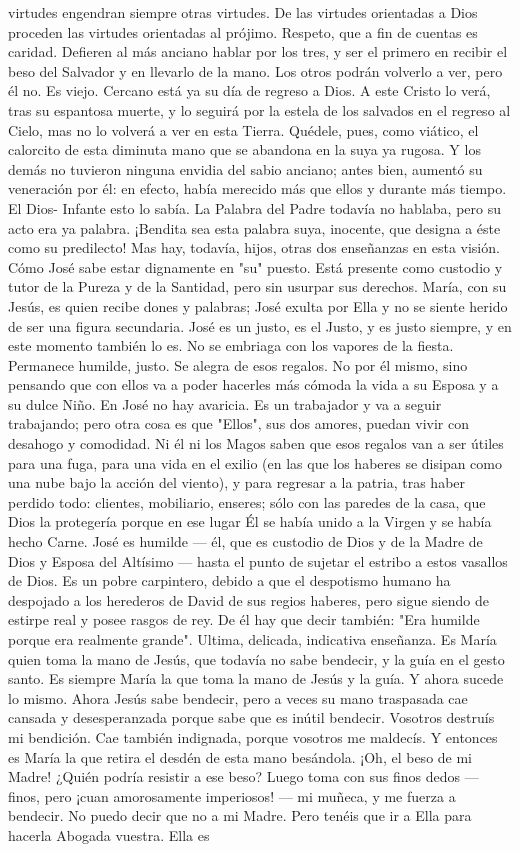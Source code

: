 \documentclass[12pt, twoside, openright]{book} %
\begin{document}
virtudes engendran siempre otras virtudes. De las virtudes orientadas a Dios proceden las virtudes orientadas al prójimo. Respeto, que a fin de cuentas es caridad. Defieren al más anciano hablar por los tres, y ser el primero en recibir el beso del Salvador y en llevarlo de la mano. Los otros podrán volverlo a ver, pero él no. Es viejo. Cercano está ya su día de regreso a Dios. A este Cristo lo verá, tras su espantosa muerte, y lo seguirá por la estela de los salvados en el regreso al Cielo, mas no lo volverá a ver en esta Tierra. Quédele, pues, como viático, el calorcito de esta diminuta mano que se abandona en la suya ya rugosa. Y los demás no tuvieron ninguna envidia del sabio anciano; antes bien, aumentó su veneración por él: en efecto, había merecido más que ellos y durante más tiempo. El Dios- Infante esto lo sabía. La Palabra del Padre todavía no hablaba, pero su acto era ya palabra. ¡Bendita sea esta palabra suya, inocente, que designa a éste como su predilecto! Mas hay, todavía, hijos, otras dos enseñanzas en esta visión. Cómo José sabe estar dignamente en "su" puesto. Está presente como custodio y tutor de la Pureza y de la Santidad, pero sin usurpar sus derechos. María, con su Jesús, es quien recibe dones y palabras; José exulta por Ella y no se siente herido de ser una figura secundaria. José es un justo, es el Justo, y es justo siempre, y en este momento también lo es. No se embriaga con los vapores de la fiesta. Permanece humilde, justo. Se alegra de esos regalos. No por él mismo, sino pensando que con ellos va a poder hacerles más cómoda la vida a su Esposa y a su dulce Niño. En José no hay avaricia. Es un trabajador y va a seguir trabajando; pero otra cosa es que "Ellos", sus dos amores, puedan vivir con desahogo y comodidad. Ni él ni los Magos saben que esos regalos van a ser útiles para una fuga, para una vida en el exilio (en las que los haberes se disipan como una nube bajo la acción del viento), y para regresar a la patria, tras haber perdido todo: clientes, mobiliario, enseres; sólo con las paredes de la casa, que Dios la protegería porque en ese lugar Él se había unido a la Virgen y se había hecho Carne. José es humilde — él, que es custodio de Dios y de la Madre de Dios y Esposa del Altísimo — hasta el punto de sujetar el estribo a estos vasallos de Dios. Es un pobre carpintero, debido a que el despotismo humano ha despojado a los herederos de David de sus regios haberes, pero sigue siendo de estirpe real y posee rasgos de rey. De él hay que decir también: "Era humilde porque era realmente grande". Ultima, delicada, indicativa enseñanza. Es María quien toma la mano de Jesús, que todavía no sabe bendecir, y la guía en el gesto santo. Es siempre María la que toma la mano de Jesús y la guía. Y ahora sucede lo mismo. Ahora Jesús sabe bendecir, pero a veces su mano traspasada cae cansada y desesperanzada porque sabe que es inútil bendecir. Vosotros destruís mi bendición. Cae también indignada, porque vosotros me maldecís. Y entonces es María la que retira el desdén de esta mano besándola. ¡Oh, el beso de mi Madre! ¿Quién podría resistir a ese beso? Luego toma con sus finos dedos — finos, pero ¡cuan amorosamente imperiosos! — mi muñeca, y me fuerza a bendecir. No puedo decir que no a mi Madre. Pero tenéis que ir a Ella para hacerla Abogada vuestra. Ella es 
\end{document}
